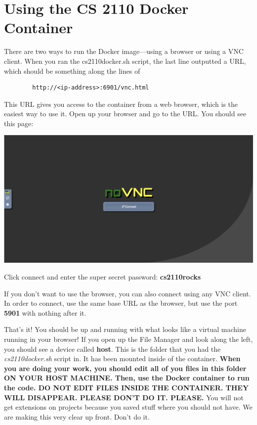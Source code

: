 \section{Using the CS 2110 Docker Container}
There are two ways to run the Docker image---using a browser or using a VNC client. When you ran the cs2110docker.sh script, the last line outputted a URL, which should be something along the lines of

\begin{center}
    \begin{verbatim}
        http://<ip-address>:6901/vnc.html
    \end{verbatim}
\end{center}

This URL gives you access to the container from a web browser, which is the easiest way to use it. Open up your browser and go to the URL. You should see this page:
\begin{center}
    \includegraphics[scale=0.25]{docker.png}
\end{center}
Click connect and enter the super secret password: \textbf{cs2110rocks}

If you don’t want to use the browser, you can also connect using any VNC client. In order to connect, use the same base URL as the browser, but use the port \textbf{5901} with nothing after it.

That’s it! You should be up and running with what looks like a virtual machine running in your browser! If you open up the File Manager and look along the left, you should see a device called \textbf{host}. This is the folder that you had the \textit{cs2110docker.sh} script in. It has been mounted inside of the container. \textbf{When you are doing your work, you should edit all of you files in this folder ON YOUR HOST MACHINE. Then, use the Docker container to run the code. DO NOT EDIT FILES INSIDE THE CONTAINER. THEY WILL DISAPPEAR. PLEASE DON’T DO IT. PLEASE.} You will not get extensions on projects because you saved stuff where you should not have. We are making this very clear up front. Don’t do it.

